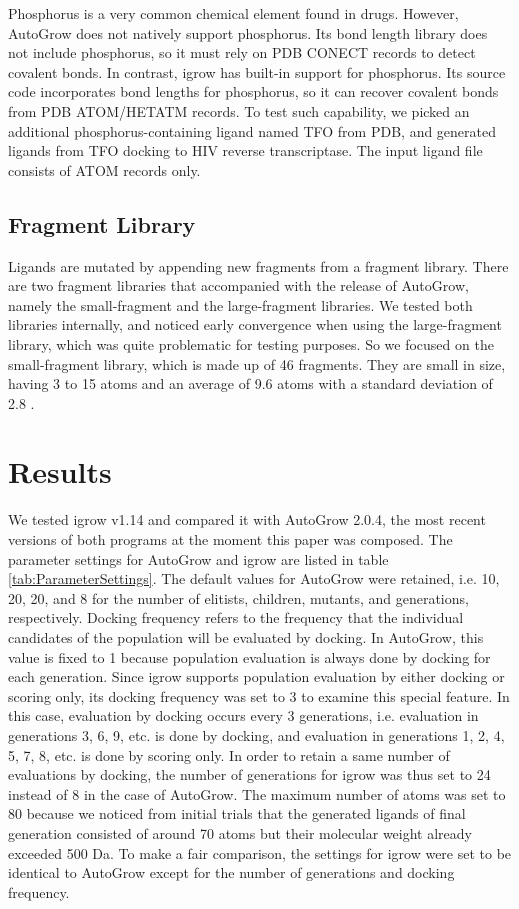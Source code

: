 \documentclass[10pt,conference,letterpaper]{IEEEtran}
\begin{document}
Phosphorus is a very common chemical element found in drugs. However, AutoGrow does not natively support phosphorus. Its bond length library does not include phosphorus, so it must rely on PDB CONECT records to detect covalent bonds. In contrast, igrow has built-in support for phosphorus. Its source code incorporates bond lengths for phosphorus, so it can recover covalent bonds from PDB ATOM/HETATM records. To test such capability, we picked an additional phosphorus-containing ligand named TFO from PDB, and generated ligands from TFO docking to HIV reverse transcriptase. The input ligand file consists of ATOM records only.

\subsection{Fragment Library}
Ligands are mutated by appending new fragments from a fragment library.
There are two fragment libraries that accompanied with the release of AutoGrow, namely the small-fragment and the large-fragment libraries.
We tested both libraries internally, and noticed early convergence when using the large-fragment library, which was quite problematic for testing purposes.
So we focused on the small-fragment library, which is made up of 46 fragments.
They are small in size, having 3 to 15 atoms and an average of 9.6 atoms with a standard deviation of 2.8 \cite{114}.

\section{Results}\label{sec:results}
We tested igrow v1.14 and compared it with AutoGrow 2.0.4, the most recent versions of both programs at the moment this paper was composed.
The parameter settings for AutoGrow and igrow are listed in table \ref{tab:ParameterSettings}.
The default values for AutoGrow were retained, i.e. 10, 20, 20, and 8 for the number of elitists, children, mutants, and generations, respectively.
Docking frequency refers to the frequency that the individual candidates of the population will be evaluated by docking. In AutoGrow, this value is fixed to 1 because population evaluation is always done by docking for each generation. Since igrow supports population evaluation by either docking or scoring only, its docking frequency was set to 3 to examine this special feature. In this case, evaluation by docking occurs every 3 generations, i.e. evaluation in generations 3, 6, 9, etc. is done by docking, and evaluation in generations 1, 2, 4, 5, 7, 8, etc. is done by scoring only. In order to retain a same number of evaluations by docking, the number of generations for igrow was thus set to 24 instead of 8 in the case of AutoGrow.
The maximum number of atoms was set to 80 because we noticed from initial trials that the generated ligands of final generation consisted of around 70 atoms but their molecular weight already exceeded 500 Da.
To make a fair comparison, the settings for igrow were set to be identical to AutoGrow except for the number of generations and docking frequency.
\end{document}
